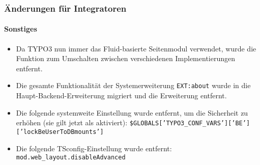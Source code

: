 %

\begin{frame}[fragile]
	\frametitle{Änderungen für Integratoren}
	\framesubtitle{Sonstiges}

	\begin{itemize}
		\item Da TYPO3 nun immer das Fluid-basierte Seitenmodul verwendet, wurde
			die Funktion zum Umschalten zwischen verschiedenen Implementierungen entfernt.
		\item Die gesamte Funktionalität der Systemerweiterung \texttt{EXT:about}
			wurde in die Haupt-Backend-Erweiterung migriert und die
			Erweiterung entfernt.
		\item Die folgende systemweite Einstellung wurde entfernt, um die Sicherheit zu erhöhen
			(sie gilt jetzt als aktiviert):\newline
			\smaller\texttt{\$GLOBALS['TYPO3\_CONF\_VARS']['BE']['lockBeUserToDBmounts']}\normalsize
		\item Die folgende TSconfig-Einstellung wurde entfernt:\newline
			\smaller\texttt{mod.web\_layout.disableAdvanced}\normalsize
	\end{itemize}

\end{frame}

